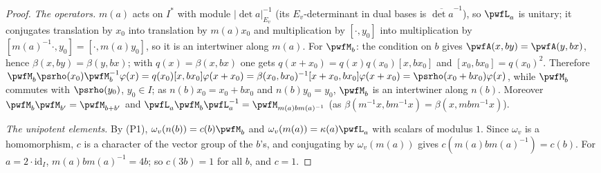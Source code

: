 \documentclass[10pt]{amsart}
\theoremstyle{definition}
\theoremstyle{remark}
\providecommand{\aubar}[1]{\overline{#1}}
\begin{document}
\begin{proof}
\emph{The operators.} $m(a)$ acts on $I^*$ with module $|\det a|_{E_v}^{-1}$ (its
$E_v$-determinant in dual bases is $\aubar{\det a}^{-1}$), so $\pwfL_a$ is unitary; it conjugates
translation by $x_0$ into translation by $m(a)x_0$ and multiplication by $[\cdot,y_0]$ into
multiplication by $[m(a)^{-1}\cdot,y_0]=[\cdot,m(a)y_0]$, so it is an intertwiner along $m(a)$. For
$\pwfM_b$: the condition on $b$ gives $\pwfA(x,by)=\pwfA(y,bx)$, hence $\beta(x,by)=\beta(y,bx)$; with
$q(x)=\beta(x,bx)$ one gets $q(x+x_0)=q(x)q(x_0)[x,bx_0]$ and $[x_0,bx_0]=q(x_0)^2$. Therefore
$\pwfM_b\psrho(x_0)\pwfM_b^{-1}\varphi(x)=q(x_0)[x,bx_0]\varphi(x+x_0)=\beta(x_0,bx_0)^{-1}[x+x_0,bx_0]
\varphi(x+x_0)=\psrho(x_0+bx_0)\varphi(x)$, while $\pwfM_b$ commutes with $\psrho(y_0)$, $y_0\in I$;
as $n(b)x_0=x_0+bx_0$ and $n(b)y_0=y_0$, $\pwfM_b$ is an intertwiner along $n(b)$. Moreover
$\pwfM_b\pwfM_{b'}=\pwfM_{b+b'}$ and $\pwfL_a\pwfM_b\pwfL_a^{-1}=\pwfM_{m(a)bm(a)^{-1}}$ (as
$\beta(m^{-1}x,bm^{-1}x)=\beta(x,mbm^{-1}x)$).

\emph{The unipotent elements.} By (P1), $\omega_v(n(b))=c(b)\pwfM_b$ and $\omega_v(m(a))=\kappa(a)
\pwfL_a$ with scalars of modulus $1$. Since $\omega_v$ is a homomorphism, $c$ is a character of the
vector group of the $b$'s, and conjugating by $\omega_v(m(a))$ gives $c(m(a)bm(a)^{-1})=c(b)$. For
$a=2\cdot\mathrm{id}_I$, $m(a)bm(a)^{-1}=4b$; so $c(3b)=1$ for all $b$, and $c=1$.


\end{proof}
\end{document}
